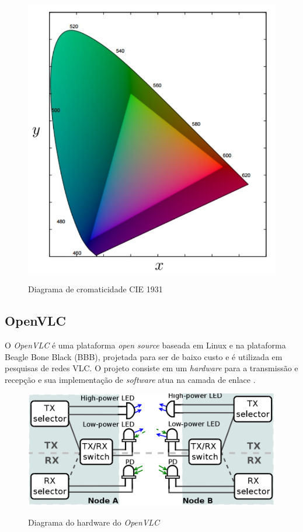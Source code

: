 \begin{figure}[!htbp]
  \caption{Diagrama de cromaticidade CIE 1931}
  \includegraphics[scale=0.35]{images/csk.png}
  \label{fig:}
\end{figure}


\subsection{OpenVLC}

O \textit{OpenVLC} é uma plataforma \textit{open source} baseada em  Linux e na plataforma Beagle Bone Black (BBB), projetada para ser de baixo custo e é utilizada em pesquisas de redes VLC. O projeto consiste em um \textit{hardware} para a transmissão e recepção e sua implementação de \textit{software} atua na camada de enlace \cite{OpenVLCB}. \newline

\begin{figure}[!htbp]
    \caption{Diagrama do hardware do \textit{OpenVLC}}
    \includegraphics[scale=0.7]{images/diagram_cape_OpenVLC.png}
    \label{figura:diagramaVLC}
\end{figure}


